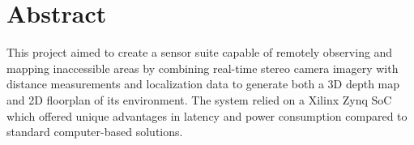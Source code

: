 {}
\section*{Abstract}
This project aimed to create a sensor suite capable of remotely observing and mapping inaccessible areas by combining real-time stereo camera imagery with distance measurements and localization data to generate both a 3D depth map and 2D floorplan of its environment. The system relied on a Xilinx Zynq SoC which offered unique advantages in latency and power consumption compared to standard computer-based solutions.